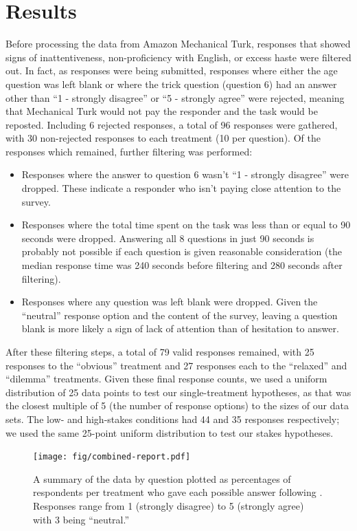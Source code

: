\section{Results}

Before processing the data from Amazon Mechanical Turk, responses that showed signs of inattentiveness, non-proficiency with English, or excess haste were filtered out.
%
In fact, as responses were being submitted, responses where either the age question was left blank or where the trick question (question 6) had an answer other than ``1 - strongly disagree'' or ``5 - strongly agree'' were rejected, meaning that Mechanical Turk would not pay the responder and the task would be reposted.
%
Including 6 rejected responses, a total of 96 responses were gathered, with 30 non-rejected responses to each treatment (10 per question).
%
Of the responses which remained, further filtering was performed:
%
\begin{itemize}
  \item Responses where the answer to question 6 wasn't ``1 - strongly disagree'' were dropped. These indicate a responder who isn't paying close attention to the survey.
  \item Responses where the total time spent on the task was less than or equal to 90 seconds were dropped. Answering all 8 questions in just 90 seconds is probably not possible if each question is given reasonable consideration (the median response time was 240 seconds before filtering and 280 seconds after filtering).
  \item Responses where any question was left blank were dropped. Given the ``neutral'' response option and the content of the survey, leaving a question blank is more likely a sign of lack of attention than of hesitation to answer.
\end{itemize}
%
After these filtering steps, a total of 79 valid responses remained, with 25 responses to the ``obvious'' treatment and 27 responses each to the ``relaxed'' and ``dilemma'' treatments.
%
Given these final response counts, we used a uniform distribution of 25 data points to test our single-treatment hypotheses, as that was the closest multiple of 5 (the number of response options) to the sizes of our data sets.
%
The low- and high-stakes conditions had 44 and 35 responses respectively; we used the same 25-point uniform distribution to test our stakes hypotheses.


\begin{figure}[h]
  \hspace*{-2.2em}\texttt{[image: fig/combined-report.pdf]}
  \caption{A summary of the data by question plotted as percentages of respondents per treatment who gave each possible answer following \citep{Robbins2011}. Responses range from 1 (strongly disagree) to 5 (strongly agree) with 3 being ``neutral.''}
  \label{fig:report}
\end{figure}


